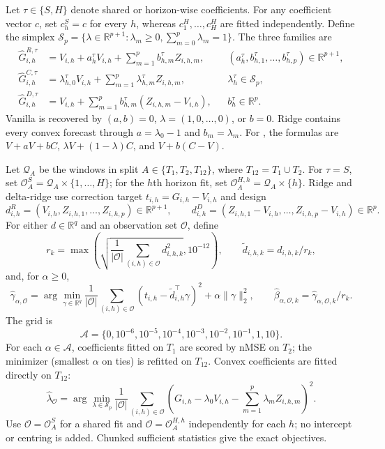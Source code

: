 \documentclass[10pt]{article}
\newcommand{\reals}{\mathbb{R}}
\newcommand{\code}[1]{\texttt{\detokenize{#1}}}
\newcommand{\Tone}{T_1}
\newcommand{\Ttwo}{T_2}
\newcommand{\Tpool}{T_{12}}
\begin{document}
Let $\tau\in\{S,H\}$ denote shared or horizon-wise coefficients. For any
coefficient vector $c$, set $c_h^S=c$ for every $h$, whereas
$c_1^H,\ldots,c_H^H$ are fitted independently. Define the simplex
$\mathcal S_p=\{\lambda\in\reals^{p+1}:\lambda_m\geq0,
\sum_{m=0}^{p}\lambda_m=1\}$. The three families are
\begin{align}
 \widehat G^{R,\tau}_{i,h}
 &=V_{i,h}+a_h^\tau V_{i,h}
   +\sum_{m=1}^{p}b_{h,m}^\tau Z_{i,h,m},
 &&(a_h^\tau,b_{h,1}^\tau,\ldots,b_{h,p}^\tau)\in\reals^{p+1},
 \label{eq:ridge-family}\\
 \widehat G^{C,\tau}_{i,h}
 &=\lambda_{h,0}^\tau V_{i,h}
   +\sum_{m=1}^{p}\lambda_{h,m}^\tau Z_{i,h,m},
 &&\lambda_h^\tau\in\mathcal S_p,
 \label{eq:convex-family}\\
 \widehat G^{D,\tau}_{i,h}
 &=V_{i,h}+\sum_{m=1}^{p}b_{h,m}^\tau
   (Z_{i,h,m}-V_{i,h}),
 &&b_h^\tau\in\reals^p.
 \label{eq:delta-family}
\end{align}
Vanilla is recovered by $(a,b)=0$, $\lambda=(1,0,\ldots,0)$, or $b=0$.
Ridge contains every convex forecast through
$a=\lambda_0-1$ and $b_m=\lambda_m$. For \code{cov}, the formulas are
$V+aV+bC$, $\lambda V+(1-\lambda)C$, and $V+b(C-V)$.

Let $\mathcal Q_A$ be the windows in split $A\in\{\Tone,\Ttwo,\Tpool\}$,
where $\Tpool=\Tone\cup\Ttwo$. For $\tau=S$, set
$\mathcal O_A^S=\mathcal Q_A\times\{1,\ldots,H\}$; for the $h$th
horizon fit, set $\mathcal O_A^{H,h}=\mathcal Q_A\times\{h\}$. Ridge and
delta-ridge use correction target $t_{i,h}=G_{i,h}-V_{i,h}$ and design
\[
 d^R_{i,h}=(V_{i,h},Z_{i,h,1},\ldots,Z_{i,h,p})\in\reals^{p+1},
 \qquad
 d^D_{i,h}=(Z_{i,h,1}-V_{i,h},\ldots,Z_{i,h,p}-V_{i,h})\in\reals^p.
\]
For either $d\in\reals^q$ and an observation set $\mathcal O$, define
\[
 r_k=\max\!\left(
  \sqrt{\frac1{|\mathcal O|}\sum_{(i,h)\in\mathcal O}d_{i,h,k}^2},10^{-12}
 \right),
 \qquad \widetilde d_{i,h,k}=d_{i,h,k}/r_k,
\]
and, for $\alpha\geq0$,
\[
 \widehat\gamma_{\alpha,\mathcal O}
 =\arg\min_{\gamma\in\reals^{q}}
 \frac1{|\mathcal O|}\sum_{(i,h)\in\mathcal O}
 (t_{i,h}-\widetilde d_{i,h}^{\top}\gamma)^2
 +\alpha\|\gamma\|_2^2,
 \qquad
 \widehat\beta_{\alpha,\mathcal O,k}
 =\widehat\gamma_{\alpha,\mathcal O,k}/r_k.
\]
The grid is
\[
 \mathcal A=\{0,10^{-6},10^{-5},10^{-4},10^{-3},10^{-2},10^{-1},1,10\}.
\]
For each $\alpha\in\mathcal A$, coefficients fitted on $\Tone$ are scored by
nMSE on $\Ttwo$; the minimizer (smallest $\alpha$ on ties) is refitted on
$\Tpool$. Convex coefficients are fitted directly on $\Tpool$:
\[
 \widehat\lambda_{\mathcal O}
 =\arg\min_{\lambda\in\mathcal S_p}
 \frac1{|\mathcal O|}\sum_{(i,h)\in\mathcal O}
 \left(G_{i,h}-\lambda_0V_{i,h}
 -\sum_{m=1}^p\lambda_mZ_{i,h,m}\right)^2.
\]
Use $\mathcal O=\mathcal O_A^S$ for a shared fit and
$\mathcal O=\mathcal O_A^{H,h}$ independently for each $h$; no intercept or
centring is added. Chunked sufficient statistics give the exact objectives.
\end{document}
